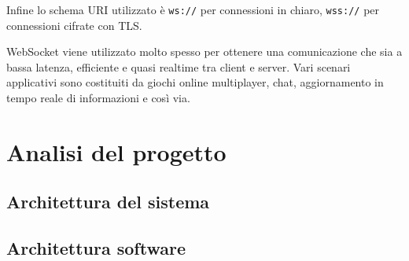 \documentclass[11pt]{article}
\begin{document}
Infine lo schema URI utilizzato è \texttt{ws://} per connessioni in chiaro, \texttt{wss://} per connessioni cifrate con TLS\cite{fette2011websocket}.

WebSocket viene utilizzato molto spesso per ottenere una comunicazione che sia a bassa latenza, efficiente e quasi realtime tra client e server. Vari scenari applicativi sono costituiti da giochi online multiplayer, chat, aggiornamento in tempo reale di informazioni e così via.

\section{Analisi del progetto}
\subsection {Architettura del sistema}

\subsection {Architettura software}
\end{document}
